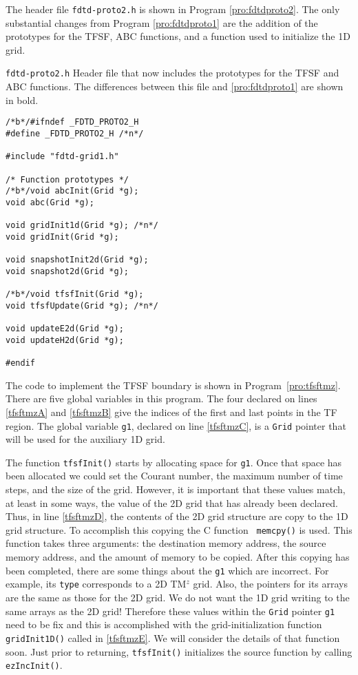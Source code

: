The header file {\tt fdtd-proto2.h} is shown in Program
\ref{pro:fdtdproto2}.  The only substantial changes from Program
\ref{pro:fdtdproto1} are the addition of the prototypes for the TFSF,
ABC functions, and a function used to initialize the 1D grid.

\begin{program}
{\tt fdtd-proto2.h} Header file that now includes the prototypes for
the TFSF and ABC functions.  The differences between this file and
\ref{pro:fdtdproto1} are shown in bold.
\label{pro:fdtdproto2}
\codemiddle
\begin{lstlisting}
/*b*/#ifndef _FDTD_PROTO2_H
#define _FDTD_PROTO2_H /*n*/

#include "fdtd-grid1.h"

/* Function prototypes */
/*b*/void abcInit(Grid *g);
void abc(Grid *g);

void gridInit1d(Grid *g); /*n*/
void gridInit(Grid *g);

void snapshotInit2d(Grid *g);
void snapshot2d(Grid *g);

/*b*/void tfsfInit(Grid *g);
void tfsfUpdate(Grid *g); /*n*/

void updateE2d(Grid *g);
void updateH2d(Grid *g);

#endif
\end{lstlisting}
\end{program}

The code to implement the TFSF boundary is shown in Program\
\ref{pro:tfsftmz}.  There are five global variables in this program.
The four declared on lines \ref{tfsftmzA} and \ref{tfsftmzB} give the
indices of the first and last points in the TF region.  The global
variable {\tt g1}, declared on line \ref{tfsftmzC}, is a {\tt Grid}
pointer that will be used for the auxiliary 1D grid.

The function {\tt tfsfInit()} starts by allocating space for {\tt g1}.
Once that space has been allocated we could set the Courant number,
the maximum number of time steps, and the size of the grid.  However,
it is important that these values match, at least in some ways, the
value of the 2D grid that has already been declared.  Thus, in line
\ref{tfsftmzD}, the contents of the 2D grid structure are copy to the
1D grid structure.  To accomplish this copying the C function {\tt
memcpy()} is used.  This function takes three arguments: the
destination memory address, the source memory address, and the amount
of memory to be copied.  After this copying has been completed, there
are some things about the {\tt g1} which are incorrect.  For example,
its {\tt type} corresponds to a 2D TM$^z$ grid.  Also, the pointers
for its arrays are the same as those for the 2D grid.  We do not want
the 1D grid writing to the same arrays as the 2D grid!  Therefore
these values within the {\tt Grid} pointer {\tt g1} need to be fix and
this is accomplished with the grid-initialization function {\tt
gridInit1D()} called in \ref{tfsftmzE}.  We will consider the details
of that function soon.  Just prior to returning, {\tt tfsfInit()}
initializes the source function by calling {\tt ezIncInit()}.

